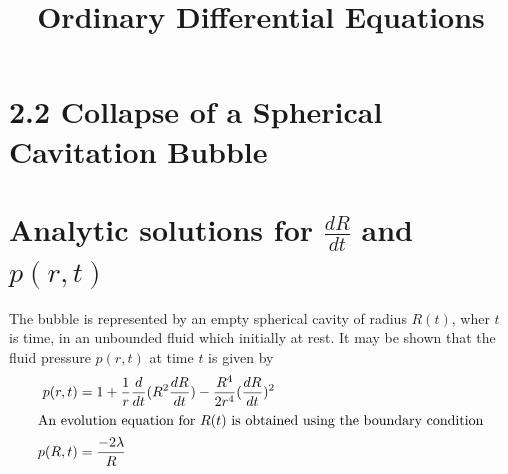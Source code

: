 \documentclass[10pt]{article}
\title{\flushleft1.2 Ordinary Differential Equations\\ }
\date{}
\begin{document}
\hfill{}
\section*{\LARGE{2.2 Collapse of a Spherical Cavitation Bubble}}

\section*{Analytic solutions for $\frac{dR}{dt}$ and $p(r,t)$}
The bubble is represented by an empty  spherical cavity of radius $R(t)$, wher $t$ is time, in an unbounded fluid which initially at rest. It may be shown that the fluid pressure $p(r,t)$ at time $t$ is given by
\begin{align}
p(r,t) &= 1+\frac{1}{r}\frac{d}{dt}(R^2\frac{dR}{dt})-\frac{R^4}{2r^4}(\frac{dR}{dt})^2\\
\intertext{An evolution equation for $R(t)$ is obtained using the boundary condition}
p(R,t) &= \frac{-2\lambda}{R}
\end{align}
\end{document}
